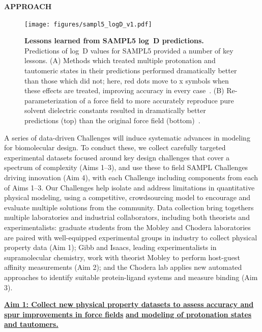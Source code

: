 \documentclass[11pt]{article}
\begin{document}
{\Large\textbf{APPROACH}}

\begin{figure}
\vspace{-0.25in}
\begin{centering}
\texttt{[image: figures/sampl5\_logD\_v1.pdf]}

\end{centering}
\footnotesize
\caption{\label{figure:sampl5_logD}  
\textbf{Lessons learned from SAMPL5 log~D predictions.} 
Predictions of log~D values for SAMPL5 provided a number of key lessons. (A) Methods which treated multiple protonation and tautomeric states in their predictions performed dramatically better than those which did not; here, red dots move to x symbols when these effects are treated, improving accuracy in every case~\cite{Pickard:2016:JComputAidedMolDes}. (B) Re-parameterization of a force field to more accurately reproduce pure solvent dielectric constants resulted in dramatically better predictions (top) than the original force field (bottom)~\cite{paranahewage_predicting_2016}. 
}
\end{figure}

A series of data-driven Challenges will induce systematic advances in modeling for biomolecular design.
To conduct these, we collect carefully targeted experimental datasets focused around key design challenges that cover a spectrum of complexity (Aims 1--3), and use these to field SAMPL Challenges driving innovation (Aim 4), with each Challenge including components from each of Aims 1--3.
Our Challenges help isolate and address limitations in quantitative physical modeling, using a competitive, crowdsourcing model to encourage and evaluate multiple solutions from the community.
Data collection bring togethers multiple laboratories and industrial collaborators, including both theorists and experimentalists: graduate students from the Mobley and Chodera laboratories are paired with well-equipped experimental groups in industry to collect physical property data (Aim 1); Gibb and Isaacs, leading experimentalists in supramolecular chemistry, work with theorist Mobley to perform host-guest affinity measurements (Aim 2); and the Chodera lab applies new automated approaches to identify suitable protein-ligand systems and measure binding (Aim 3).


\textbf{\underline{Aim 1: Collect new physical property datasets to assess accuracy and spur improvements in force fields}}
\textbf{\underline{and modeling of protonation states and tautomers.}} 
\end{document}
